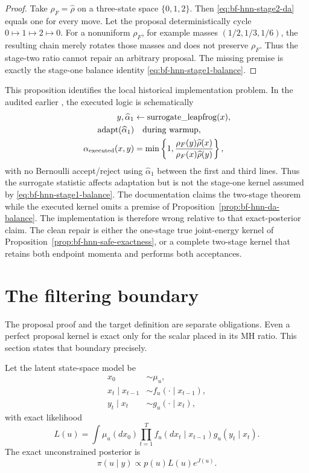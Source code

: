 \begin{proof}
Take $\rho_F=\widehat\rho$ on a three-state space
$\{0,1,2\}$.  Then \eqref{eq:bf-hnn-stage2-da} equals one for every move.
Let the proposal deterministically cycle $0\mapsto1\mapsto2\mapsto0$.
For a nonuniform $\rho_F$, for example masses $(1/2,1/3,1/6)$, the resulting
chain merely rotates those masses and does not preserve $\rho_F$.  Thus the
stage-two ratio cannot repair an arbitrary proposal.  The missing premise is
exactly the stage-one balance identity
\eqref{eq:bf-hnn-stage1-balance}.
\end{proof}

This proposition identifies the local historical implementation problem.  In
the audited earlier , the
executed logic is schematically
\begin{align}
 y,\widehat\alpha_1&\leftarrow
   \operatorname{surrogate\_leapfrog}(x),\\
 \operatorname{adapt}(\widehat\alpha_1)&\quad\text{during warmup},\\
 \alpha_{\rm executed}(x,y)&=
 \min\left\{1,
 \frac{\rho_F(y)\widehat\rho(x)}
      {\rho_F(x)\widehat\rho(y)}\right\},
 \end{align}
with no Bernoulli accept/reject using $\widehat\alpha_1$ between the first and
third lines.  Thus the surrogate statistic affects adaptation but is not the
stage-one kernel assumed by \eqref{eq:bf-hnn-stage1-balance}.  The
documentation claims the two-stage theorem while the executed kernel omits a
premise of Proposition~\ref{prop:bf-hnn-da-balance}.  The implementation is
therefore wrong relative to that exact-posterior claim.  The clean repair is
either the one-stage true joint-energy kernel of
Proposition~\ref{prop:bf-hnn-safe-exactness}, or a complete two-stage kernel
that retains both endpoint momenta and performs both acceptances.

\section{The filtering boundary}
\label{sec:bf-hnn-filtering-boundary}

The proposal proof and the target definition are separate obligations.  Even a
perfect proposal kernel is exact only for the scalar placed in its MH ratio.
This section states that boundary precisely.

Let the latent state-space model be
\begin{align}
 x_0&\sim\mu_u,\\
 x_t\mid x_{t-1}&\sim f_u(\cdot\mid x_{t-1}),\\
 y_t\mid x_t&\sim g_u(\cdot\mid x_t),
\end{align}
with exact likelihood
\begin{equation}
 L(u)=\int \mu_u(dx_0)
 \prod_{t=1}^T f_u(dx_t\mid x_{t-1})g_u(y_t\mid x_t).
 \label{eq:bf-hnn-exact-ssm-likelihood}
\end{equation}
The exact unconstrained posterior is
\begin{equation}
 \pi(u\mid y)\propto p(u)L(u)e^{J(u)}.
 \label{eq:bf-hnn-exact-posterior}
\end{equation}

